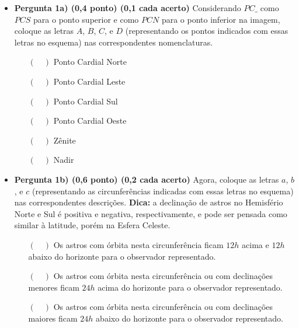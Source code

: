 \documentclass[a4paper, 12pt]{article}
\begin{document}
\begin{flushleft}
\begin{itemize}
\begin{itemize}
				\item \textbf{Pergunta 1a) (0,4 ponto) (0,1 cada acerto)} Considerando $PC\_$ como $PCS$ para o ponto superior e como $PCN$ para o ponto inferior na imagem, coloque as letras $A$, $B$, $C$, e $D$ (representando os pontos indicados com essas letras no esquema) nas correspondentes nomenclaturas.
					\begin{multicols}{3} \begin{itemize}
						\item[$(\quad)$] Ponto Cardial Norte
						\item[$(\quad)$] Ponto Cardial Leste
						\item[$(\quad)$] Ponto Cardial Sul
						\item[$(\quad)$] Ponto Cardial Oeste
						\item[$(\quad)$] Zênite
						\item[$(\quad)$] Nadir
					\end{itemize} \end{multicols}
				\item \textbf{Pergunta 1b) (0,6 ponto) (0,2 cada acerto)} Agora, coloque as letras $a$, $b$, e $c$ (representando as circunferências indicadas com essas letras no esquema) nas correspondentes descrições. \linebreak
					\textbf{Dica:} a declinação de astros no Hemisfério Norte e Sul é positiva e negativa, respectivamente, e pode ser pensada como similar à latitude, porém na Esfera Celeste.
					\begin{itemize}
						\item[$(\quad)$] Os astros com órbita nesta circunferência ficam $12h$ acima e $12h$ abaixo do horizonte para o observador representado.
						\item[$(\quad)$] Os astros com órbita nesta circunferência ou com declinações menores ficam $24h$ acima do horizonte para o observador representado.
						\item[$(\quad)$] Os astros com órbita nesta circunferência ou com declinações maiores ficam $24h$ abaixo do horizonte para o observador representado.
					\end{itemize}
			\end{itemize}
			

\end{itemize}
\end{flushleft}
\end{document}
